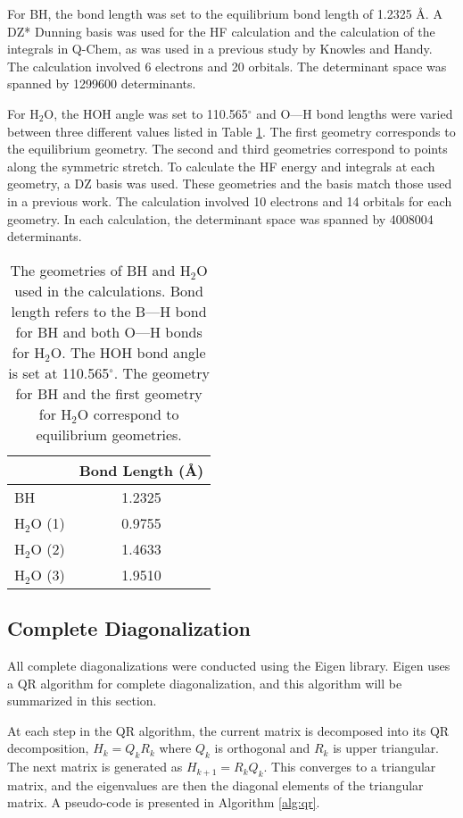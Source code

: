 \documentclass[final,3p,times,twocolumn]{elsarticle}
\begin{document}
For BH, the bond length was set to the equilibrium bond length of 1.2325 \AA. A DZ* Dunning basis\cite{dunning} was used for the HF calculation and the calculation of the integrals in Q-Chem, as was used in a previous study by Knowles and Handy.\cite{handy-1983} The calculation involved 6 electrons and 20 orbitals. The determinant space was spanned by 1299600 determinants.

For H$_2$O, the HOH angle was set to 110.565$^\circ$ and O---H bond lengths were varied between three different values listed in Table \ref{tab:geo}. The first geometry corresponds to the equilibrium geometry. The second and third geometries correspond to points along the symmetric stretch. To calculate the HF energy and integrals at each geometry, a DZ basis was used. These geometries and the basis match those used in a previous work.\cite{handy-1983} The calculation involved 10 electrons and 14 orbitals for each geometry. In each calculation, the determinant space was spanned by 4008004 determinants.
\begin{table}
\centering
\begin{tabular}{l|c}
\hline\hline
& Bond Length (\AA) \\ \hline
BH & 1.2325 \\ \hline
H$_2$O (1) & 0.9755\\
H$_2$O (2) & 1.4633\\
H$_2$O (3) & 1.9510\\ \hline\hline
\end{tabular}
\caption{The geometries of BH and H$_2$O used in the calculations. Bond length refers to the B---H bond for BH and both O---H bonds for H$_2$O. The HOH bond angle is set at 110.565$^\circ$. The geometry for BH and the first geometry for H$_2$O correspond to equilibrium geometries.}
\label{tab:geo}
\end{table}

\subsection{Complete Diagonalization} \label{sec:qr}
All complete diagonalizations were conducted using the Eigen library.\cite{eigen} Eigen uses a QR algorithm\cite{qr} for complete diagonalization, and this algorithm will be summarized in this section.

At each step in the QR algorithm, the current matrix is decomposed into its QR decomposition, $H_k = Q_kR_k$ where $Q_k$ is orthogonal and $R_k$ is upper triangular. The next matrix is generated as $H_{k+1} = R_kQ_k$. This converges to a triangular matrix, and the eigenvalues are then the diagonal elements of the triangular matrix. A pseudo-code is presented in Algorithm \ref{alg:qr}.
\end{document}
